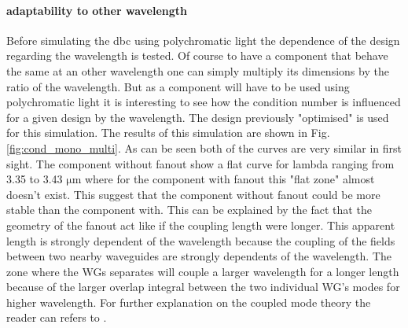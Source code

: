 \paragraph{adaptability to other wavelength}
Before simulating the \gls{dbc} using polychromatic light the dependence of the design regarding the wavelength is tested. Of course to have a component that behave the same at an other wavelength one can simply multiply its dimensions by the ratio of the wavelength. But as a component will have to be used using polychromatic light it is interesting to see how the condition number is influenced for a given design by the wavelength. The design previously "optimised" is used for this simulation. The results of this simulation are shown in Fig.\ref{fig:cond_mono_multi}. As can be seen both of the curves are very similar in first sight. The component without fanout show a flat curve for lambda ranging from 3.35 to 3.43 $\si{\micro\meter}$ where for the component with fanout this "flat zone" almost doesn't exist. This suggest that the component without fanout could be more stable than the component with. This can be explained by the fact that the geometry of the fanout act like if the coupling length were longer. This apparent length is strongly dependent of the wavelength because the coupling of the fields between two nearby waveguides are strongly dependents of the wavelength. The zone where the WGs separates will couple a larger wavelength for a longer length because of the larger overlap integral between the two  individual WG's modes for higher wavelength. For further explanation on the coupled mode theory the reader can refers to \cite{saleh_teich, marcuse}.



